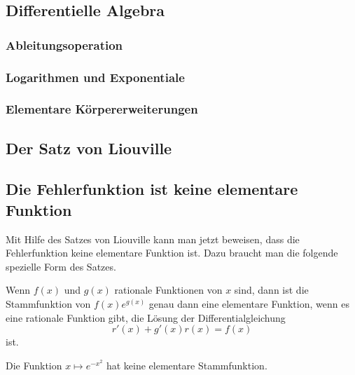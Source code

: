 \subsection{Differentielle Algebra
\label{buch:integrale:section:dalgebra}}

\subsubsection{Ableitungsoperation}

\subsubsection{Logarithmen und Exponentiale}

\subsubsection{Elementare Körpererweiterungen}

\subsection{Der Satz von Liouville
\label{buch:integrale:section:liouville}}

\subsection{Die Fehlerfunktion ist keine elementare Funktion
\label{buch:integrale:section:fehlernichtelementar}}
Mit Hilfe des Satzes von Liouville kann man jetzt beweisen, dass 
die Fehlerfunktion keine elementare Funktion ist.
Dazu braucht man die folgende spezielle Form des Satzes.

\begin{satz}
\label{buch:integrale:satz:elementarestammfunktion}
Wenn $f(x)$ und $g(x)$ rationale Funktionen von $x$ sind, dann
ist die Stammfunktion von $f(x)e^{g(x)}$ genau dann eine 
elementare Funktion, wenn es eine rationale Funktion gibt, die
Lösung der Differentialgleichung
\[
r'(x) + g'(x)r(x)=f(x)
\]
ist.
\end{satz}

\begin{satz}
Die Funktion $x\mapsto e^{-x^2}$ hat keine elementare Stammfunktion.
\label{buch:iintegrale:satz:expx2}
\end{satz}

